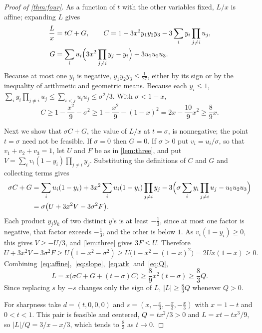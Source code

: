 \documentclass[11pt,a4paper]{article}
\numberwithin{equation}{section}
\theoremstyle{remark}
\begin{document}
\begin{proof}[Proof of \cref{thm:four}]
As a function of $t$ with the other variables fixed, $L/x$ is affine; expanding $L$ gives
\begin{equation}\label{eq:affine}
\begin{aligned}
\frac Lx&=tC+G,\qquad C=1-3x^2y_1y_2y_3-3\sum_iy_i\prod_{j\ne i}u_j,\\
G&=\sum_iu_i\Bigl(3x^2\prod_{j\ne i}y_j-y_i\Bigr)+3u_1u_2u_3 .
\end{aligned}
\end{equation}
Because at most one $y_i$ is negative, $y_1y_2y_3\le\frac1{27}$, either by its sign or by the inequality of arithmetic and geometric means. Because each $y_i\le1$, $\sum_iy_i\prod_{j\ne i}u_j\le\sum_{i<j}u_iu_j\le\sigma^2/3$. With $\sigma<1-x$,
\begin{equation}\label{eq:slope}
C\ge1-\frac{x^2}9-\sigma^2\ge1-\frac{x^2}9-(1-x)^2=2x-\frac{10}9x^2\ge\frac89x .
\end{equation}

Next we show that $\sigma C+G$, the value of $L/x$ at $t=\sigma$, is nonnegative; the point $t=\sigma$ need not be feasible. If $\sigma=0$ then $G=0$. If $\sigma>0$ put $v_i=u_i/\sigma$, so that $v_1+v_2+v_3=1$, let $U$ and $F$ be as in \cref{lem:three}, and put $V=\sum_iv_i(1-y_i)\prod_{j\ne i}y_j$. Substituting the definitions of $C$ and $G$ and collecting terms gives
\begin{equation}\label{eq:regroup}
\begin{aligned}
\sigma C+G&=\sum_iu_i(1-y_i)+3x^2\sum_iu_i(1-y_i)\prod_{j\ne i}y_j-3\Bigl(\sigma\sum_iy_i\prod_{j\ne i}u_j-u_1u_2u_3\Bigr)\\
&=\sigma\bigl(U+3x^2V-3\sigma^2F\bigr).
\end{aligned}
\end{equation}
Each product $y_jy_k$ of two distinct $y$'s is at least $-\frac13$, since at most one factor is negative, that factor exceeds $-\frac13$, and the other is below $1$. As $v_i(1-y_i)\ge0$, this gives $V\ge-U/3$, and \cref{lem:three} gives $3F\le U$. Therefore
\begin{equation}\label{eq:atk}
U+3x^2V-3\sigma^2F\ge U(1-x^2-\sigma^2)\ge U\bigl(1-x^2-(1-x)^2\bigr)=2Ux(1-x)\ge0 .
\end{equation}
Combining~\eqref{eq:affine},~\eqref{eq:slope},~\eqref{eq:atk} and~\eqref{eq:Q},
\[
L=x\bigl(\sigma C+G+(t-\sigma)C\bigr)\ge\frac89x^2(t-\sigma)\ge\frac83Q .
\]
Since replacing $s$ by $-s$ changes only the sign of $L$, $|L|\ge\frac83Q$ whenever $Q>0$.

For sharpness take $d=(t,0,0,0)$ and $s=(x,-\frac x3,-\frac x3,-\frac x3)$ with $x=1-t$ and $0<t<1$. This pair is feasible and centered, $Q=tx^2/3>0$ and $L=xt-tx^3/9$, so $|L|/Q=3/x-x/3$, which tends to $\frac83$ as $t\to0$.


\end{proof}
\end{document}
